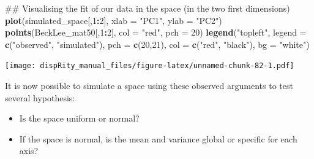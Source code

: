 \documentclass[]{book}
\newenvironment{Shaded}{\begin{snugshade}}{\end{snugshade}}
\newcommand{\KeywordTok}[1]{\textcolor[rgb]{0.13,0.29,0.53}{\textbf{#1}}}
\newcommand{\DataTypeTok}[1]{\textcolor[rgb]{0.13,0.29,0.53}{#1}}
\newcommand{\DecValTok}[1]{\textcolor[rgb]{0.00,0.00,0.81}{#1}}
\newcommand{\StringTok}[1]{\textcolor[rgb]{0.31,0.60,0.02}{#1}}
\newcommand{\OperatorTok}[1]{\textcolor[rgb]{0.81,0.36,0.00}{\textbf{#1}}}
\newcommand{\NormalTok}[1]{#1}
\providecommand{\tightlist}{%
  \setlength{\itemsep}{0pt}\setlength{\parskip}{0pt}}
\theoremstyle{definition}
\theoremstyle{definition}
\theoremstyle{remark}
\begin{document}
\begin{Shaded}
\begin{Highlighting}[]
\NormalTok{## Visualising the fit of our data in the space (in the two first dimensions)}
\KeywordTok{plot}\NormalTok{(simulated_space[,}\DecValTok{1}\OperatorTok{:}\DecValTok{2}\NormalTok{], }\DataTypeTok{xlab =} \StringTok{"PC1"}\NormalTok{, }\DataTypeTok{ylab =} \StringTok{"PC2"}\NormalTok{)}
\KeywordTok{points}\NormalTok{(BeckLee_mat50[,}\DecValTok{1}\OperatorTok{:}\DecValTok{2}\NormalTok{], }\DataTypeTok{col =} \StringTok{"red"}\NormalTok{, }\DataTypeTok{pch =} \DecValTok{20}\NormalTok{)}
\KeywordTok{legend}\NormalTok{(}\StringTok{"topleft"}\NormalTok{, }\DataTypeTok{legend =} \KeywordTok{c}\NormalTok{(}\StringTok{"observed"}\NormalTok{, }\StringTok{"simulated"}\NormalTok{),}
        \DataTypeTok{pch =} \KeywordTok{c}\NormalTok{(}\DecValTok{20}\NormalTok{,}\DecValTok{21}\NormalTok{), }\DataTypeTok{col =} \KeywordTok{c}\NormalTok{(}\StringTok{"red"}\NormalTok{, }\StringTok{"black"}\NormalTok{), }\DataTypeTok{bg =} \StringTok{"white"}\NormalTok{)}
\end{Highlighting}
\end{Shaded}

\texttt{[image: dispRity\_manual\_files/figure-latex/unnamed-chunk-82-1.pdf]}

It is now possible to simulate a space using these observed arguments to
test several hypothesis:

\begin{itemize}
\tightlist
\item
  Is the space uniform or normal?
\item
  If the space is normal, is the mean and variance global or specific
  for each axis?
\end{itemize}
\end{document}
